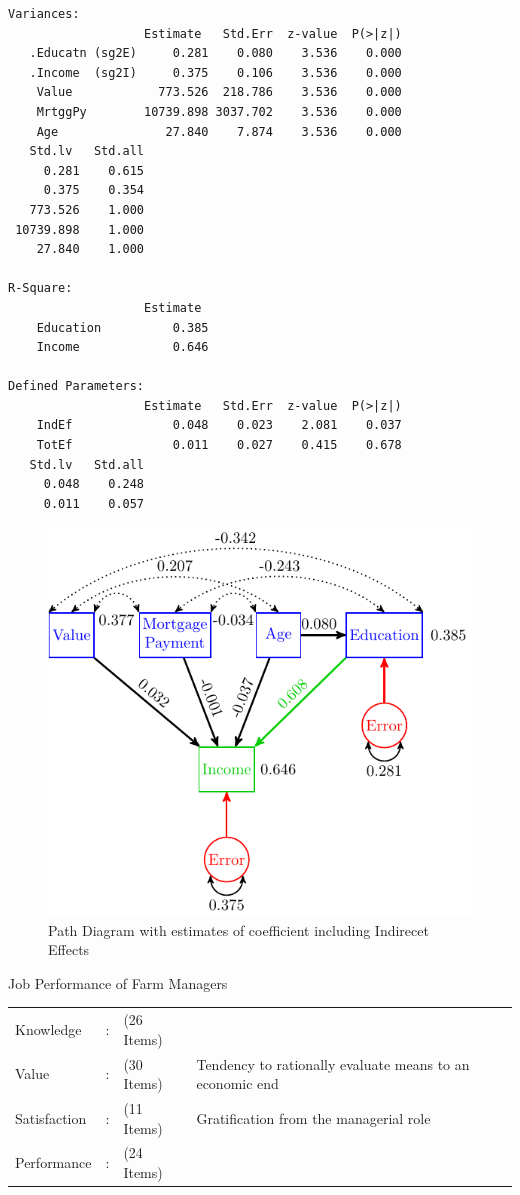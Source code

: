 \begin{verbatim}
Variances:
                   Estimate   Std.Err  z-value  P(>|z|)
   .Educatn (sg2E)     0.281    0.080    3.536    0.000
   .Income  (sg2I)     0.375    0.106    3.536    0.000
    Value            773.526  218.786    3.536    0.000
    MrtggPy        10739.898 3037.702    3.536    0.000
    Age               27.840    7.874    3.536    0.000
   Std.lv   Std.all
     0.281    0.615
     0.375    0.354
   773.526    1.000
 10739.898    1.000
    27.840    1.000

R-Square:
                   Estimate 
    Education          0.385
    Income             0.646

Defined Parameters:
                   Estimate   Std.Err  z-value  P(>|z|)
    IndEf              0.048    0.023    2.081    0.037
    TotEf              0.011    0.027    0.415    0.678
   Std.lv   Std.all
     0.048    0.248
     0.011    0.057
\end{verbatim}

\begin{figure}[H]

{\centering \includegraphics[width=0.8\linewidth]{images/Reg3Values} 

}

\caption{Path Diagram with estimates of coefficient including Indirecet Effects}\label{fig:Reg3Values}
\end{figure}

\begin{example}
Job Performance of Farm Managers

\begin{tabular}{lclp{7cm}}
Knowledge  & : & (26 Items) & \tabularnewline
Value & : & (30 Items) & Tendency to rationally evaluate means to an economic end\tabularnewline
Satisfaction & : & (11 Items) & Gratification from the managerial role\tabularnewline
Performance & : & (24 Items) & \tabularnewline
\end{tabular}


\end{example}

